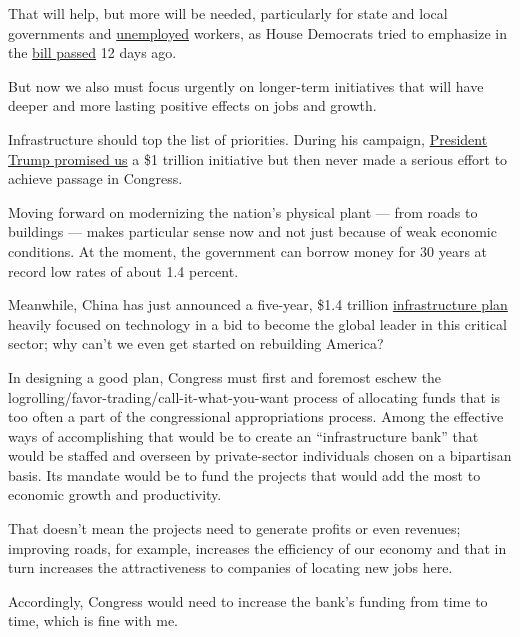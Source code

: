 That will help, but more will be needed, particularly for state and
local governments and
\href{https://www.nytimes3xbfgragh.onion/2020/05/28/business/economy/coronavirus-stimulus-unemployment.html}{unemployed}
workers, as House Democrats tried to emphasize in the
\href{https://www.nytimes3xbfgragh.onion/2020/05/15/us/politics/house-simulus-vote.html}{bill
passed} 12 days ago.

But now we also must focus urgently on longer-term initiatives that will
have deeper and more lasting positive effects on jobs and growth.

Infrastructure should top the list of priorities. During his campaign,
\href{https://www.nytimes3xbfgragh.onion/2016/08/03/us/politics/trump-clinton-infrastructure.html}{President
Trump promised us} a \$1 trillion initiative but then never made a
serious effort to achieve passage in Congress.

Moving forward on modernizing the nation's physical plant --- from roads
to buildings --- makes particular sense now and not just because of weak
economic conditions. At the moment, the government can borrow money for
30 years at record low rates of about 1.4 percent.

Meanwhile, China has just announced a five-year, \$1.4 trillion
\href{https://www.bloomberg.com/news/articles/2020-05-20/china-has-a-new-1-4-trillion-plan-to-overtake-the-u-s-in-tech?sref=qN0DZypA}{infrastructure
plan} heavily focused on technology in a bid to become the global leader
in this critical sector; why can't we even get started on rebuilding
America?

In designing a good plan, Congress must first and foremost eschew the
logrolling/favor-trading/call-it-what-you-want process of allocating
funds that is too often a part of the congressional appropriations
process. Among the effective ways of accomplishing that would be to
create an ``infrastructure bank'' that would be staffed and overseen by
private-sector individuals chosen on a bipartisan basis. Its mandate
would be to fund the projects that would add the most to economic growth
and productivity.

That doesn't mean the projects need to generate profits or even
revenues; improving roads, for example, increases the efficiency of our
economy and that in turn increases the attractiveness to companies of
locating new jobs here.

Accordingly, Congress would need to increase the bank's funding from
time to time, which is fine with me.

